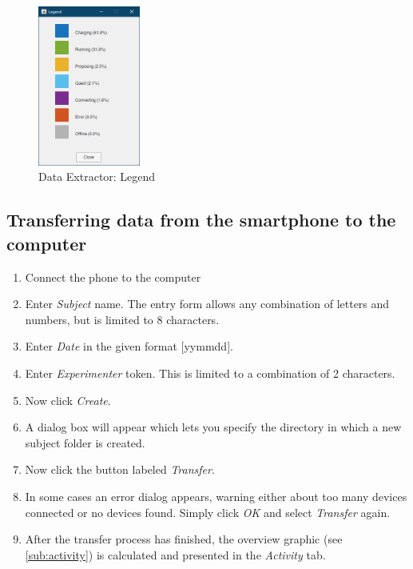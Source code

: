 \documentclass[11pt,a4paper,titlepage]{article}
\begin{document}
\begin{figure}
	\centering
		\includegraphics[width=0.30\textwidth]{images/Legend.PNG}
	\caption{Data Extractor: Legend}
	\label{fig:Legend}
\end{figure}




\subsection{Transferring data from the smartphone to the computer}\label{sub:transfer}


\begin{enumerate}
	\item Connect the phone to the computer
	\item Enter \textit{Subject} name. The entry form allows any combination of letters and numbers, but is limited to 8 characters.
	\item Enter \textit{Date} in the given format [yymmdd].
	\item Enter \textit{Experimenter} token. This is limited to a combination of 2 characters.
	\item Now click \textit{Create}.
	\item A dialog box will appear which lets you specify the directory in which a new subject folder is created.
	\item Now click the button labeled \textit{Transfer}.
	\item In some cases an error dialog appears, warning either about too many devices connected or no devices found. Simply click \textit{OK} and select \textit{Transfer} again.
	\item After the transfer process has finished, the overview graphic (see \ref{sub:activity}) is calculated and presented in the \textit{Activity} tab.
\end{enumerate}
\end{document}
